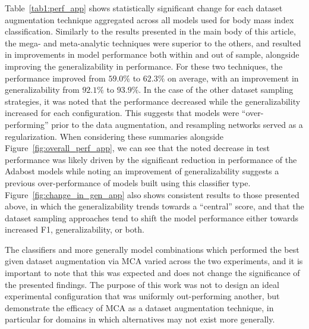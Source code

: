 \documentclass[10pt]{SelfArx} %
\begin{document}
{Table~\ref{tab1:perf_app} shows statistically significant change for each dataset augmentation technique aggregated
across all models used for body mass index classification. Similarly to the results presented in the main body of this
article, the mega- and meta-analytic techniques were superior to the others, and resulted in improvements in model
performance both within and out of sample, alongside improving the generalizability in performance. For these two
techniques, the performance improved from $59.0\%$ to $62.3\%$ on average, with an improvement in generalizability from
$92.1\%$ to $93.9\%$. In the case of the other dataset sampling strategies, it was noted that the performance decreased
while the generalizability increased for each configuration. This suggests that models were ``over-performing'' prior
to the data augmentation, and resampling networks served as a regularization. When considering these summaries
alongside Figure~\ref{fig:overall_perf_app}, we can see that the noted decrease in test performance was likely driven
by the significant reduction in performance of the Adabost models while noting an improvement of generalizability
suggests a previous over-performance of models built using this classifier type. Figure~\ref{fig:change_in_gen_app}
also shows consistent results to those presented above, in which the generalizability trends towards a ``central''
score, and that the dataset sampling approaches tend to shift the model performance either towards increased F1,
generalizability, or both.

The classifiers and more generally model combinations which performed the best given dataset augmentation via MCA
varied across the two experiments, and it is important to note that this was expected and does not change the
significance of the presented findings. The purpose of this work was not to design an ideal experimental configuration
that was uniformly out-performing another, but demonstrate the efficacy of MCA as a dataset augmentation technique,
in particular for domains in which alternatives may not exist more generally.
}
\end{document}
